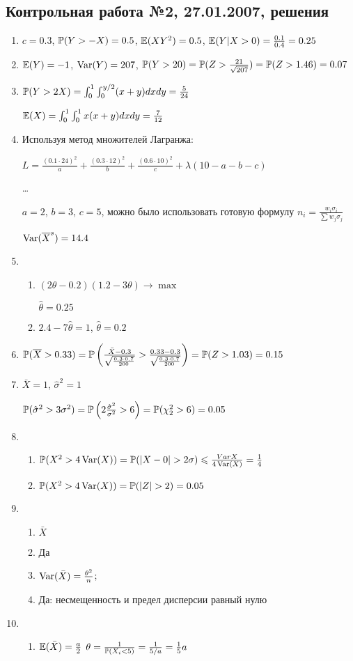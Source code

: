 \subsection{Контрольная работа №2, 27.01.2007, решения}

\begin{enumerate}
\item $c=0.3$, $\P(Y>-X)=0.5$, $\E(XY^{2})=0.5$, $\E(Y|X>0)=\frac{0.1}{0.4}=0.25$
\item $\E(Y)=-1$, $\Var(Y)=207$, $\P(Y>20)=\P(Z>\frac{21}{\sqrt{207}})=\P(Z>1.46)=0.07$
\item $\P(Y>2X)=\int_{0}^{1}\int_{0}^{y/2}(x+y)dxdy=\frac{5}{24}$

$\E(X)=\int_{0}^{1}\int_{0}^{1}x(x+y)dxdy=\frac{7}{12}$
\item Используя метод множителей Лагранжа:

$L=\frac{(0.1\cdot 24)^{2}}{a}+\frac{(0.3\cdot 12)^{2}}{b}+\frac{(0.6\cdot 10)^{2}}{c}+\lambda(10-a-b-c)$

\ldots

$a=2$, $b=3$, $c=5$, можно было использовать готовую формулу
$n_{i}=\frac{w_{i}\sigma_{i}}{\sum w_{j}\sigma_{j}}$

$\Var(\overline{X}^{s})=14.4$
\item
\begin{enumerate}
\item $(2\theta-0.2)(1.2-3\theta)\rightarrow\max$

$\hat{\theta}=0.25$
\item $2.4-7\hat{\theta}=1$, $\hat{\theta}=0.2$
\end{enumerate}
\item $\P(\overline{X}>0.33)=\P\left(\frac{\bar{X}-0.3}{\sqrt{\frac{0.3\cdot
0.7}{200}}}>\frac{0.33-0.3}{\sqrt{\frac{0.3\cdot
0.7}{200}}}\right)=\P(Z>1.03)=0.15$
\item $\bar{X}=1$, $\hat{\sigma}^{2}=1$

$\P(\hat{\sigma}^{2}>3\sigma^{2})=\P\left(2\frac{\hat{\sigma}^{2}}{\sigma^{2}}>6\right)=\P(\chi_{2}^{2}>6)=0.05$
\item
\begin{enumerate}
\item $\P(X^{2}>4\Var(X))=\P(|X-0|>2\sigma)\le
\frac{Var{X}}{4\Var(X)}=\frac{1}{4}$
\item $\P(X^{2}>4\Var(X))=\P(|Z|>2)=0.05$
\end{enumerate}
\item
\begin{enumerate}
\item $\bar{X}$
\item Да
\item $\Var(\bar{X})=\frac{\theta^{2}}{n}$;
\item Да: несмещенность и предел дисперсии равный нулю
\end{enumerate}
\item
\begin{enumerate}
\item $\E(\bar{X})=\frac{a}{2}$
$\theta=\frac{1}{\P(X_{i}<5)}=\frac{1}{5/a}=\frac{1}{5}a$


\end{enumerate}
\end{enumerate}
